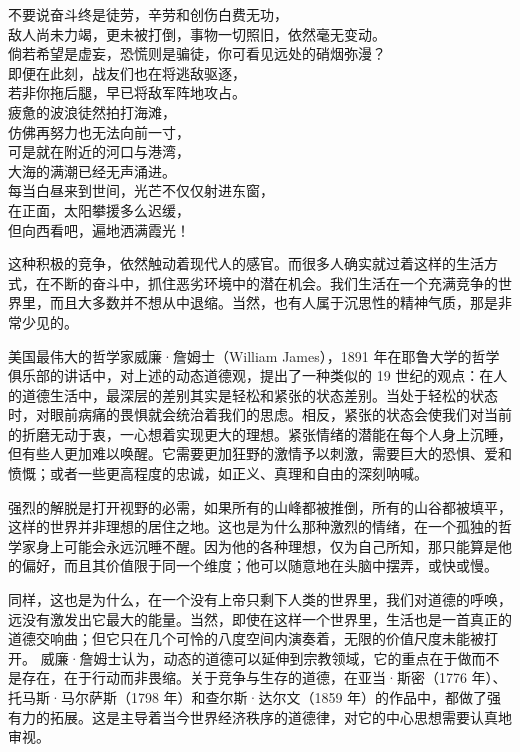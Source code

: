 \begin{tcolorbox}
\kaishu \begin{center}
不要说奋斗终是徒劳，辛劳和创伤白费无功，\\
敌人尚未力竭，更未被打倒，事物一切照旧，依然毫无变动。\\

倘若希望是虚妄，恐慌则是骗徒，你可看见远处的硝烟弥漫？\\
即便在此刻，战友们也在将逃敌驱逐，\\
若非你拖后腿，早已将敌军阵地攻占。\\

疲惫的波浪徒然拍打海滩，\\
仿佛再努力也无法向前一寸，\\
可是就在附近的河口与港湾，\\
大海的满潮已经无声涌进。\\

每当白昼来到世间，光芒不仅仅射进东窗，\\
在正面，太阳攀援多么迟缓，\\
但向西看吧，遍地洒满霞光！
\end{center}
\end{tcolorbox}


这种积极的竞争，依然触动着现代人的感官。而很多人确实就过着这样的生活方式，在不断的奋斗中，抓住恶劣环境中的潜在机会。我们生活在一个充满竞争的世界里，而且大多数并不想从中退缩。当然，也有人属于沉思性的精神气质，那是非常少见的。

美国最伟大的哲学家威廉·詹姆士（William James），1891 年在耶鲁大学的哲学俱乐部的讲话中，对上述的动态道德观，提出了一种类似的 19 世纪的观点：在人的道德生活中，最深层的差别其实是轻松和紧张的状态差别。当处于轻松的状态时，对眼前病痛的畏惧就会统治着我们的思虑。相反，紧张的状态会使我们对当前的折磨无动于衷，一心想着实现更大的理想。紧张情绪的潜能在每个人身上沉睡，但有些人更加难以唤醒。它需要更加狂野的激情予以刺激，需要巨大的恐惧、爱和愤慨；或者一些更高程度的忠诚，如正义、真理和自由的深刻呐喊。

强烈的解脱是打开视野的必需，如果所有的山峰都被推倒，所有的山谷都被填平，这样的世界并非理想的居住之地。这也是为什么那种激烈的情绪，在一个孤独的哲学家身上可能会永远沉睡不醒。因为他的各种理想，仅为自己所知，那只能算是他的偏好，而且其价值限于同一个维度；他可以随意地在头脑中摆弄，或快或慢。

同样，这也是为什么，在一个没有上帝只剩下人类的世界里，我们对道德的呼唤，远没有激发出它最大的能量。当然，即使在这样一个世界里，生活也是一首真正的道德交响曲；但它只在几个可怜的八度空间内演奏着，无限的价值尺度未能被打开。 威廉·詹姆士认为，动态的道德可以延伸到宗教领域，它的重点在于做而不是存在，在于行动而非畏缩。关于竞争与生存的道德，在亚当·斯密（1776 年）、托马斯·马尔萨斯（1798 年）和查尔斯·达尔文（1859 年）的作品中，都做了强有力的拓展。这是主导着当今世界经济秩序的道德律，对它的中心思想需要认真地审视。

